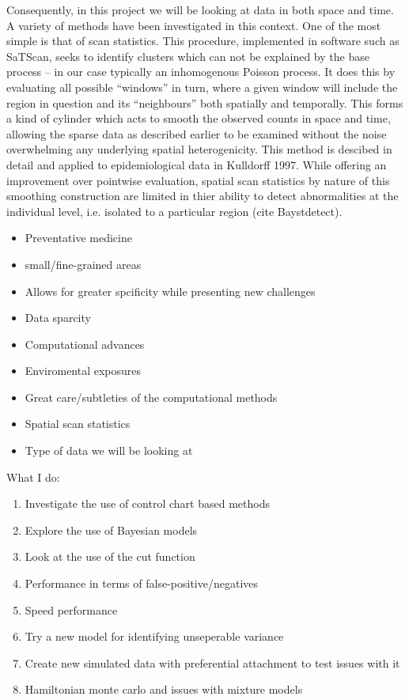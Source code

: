 \documentclass{article}
\begin{document}
Consequently, in this project we will be looking at data in both space and time. A variety of methods have been investigated in this context. One of the most simple is that of scan statistics. This procedure, implemented in software such as SaTScan, seeks to identify clusters which can not be explained by the base process -- in our case typically an inhomogenous Poisson process. It does this by evaluating all possible ``windows'' in turn, where a given window will include the region in question and its ``neighbours'' both spatially and temporally. This forms a kind of cylinder which acts to smooth the observed counts in space and time, allowing the sparse data as described earlier to be examined without the noise overwhelming any underlying spatial heterogenicity. This method is descibed in detail and applied to epidemiological data in Kulldorff 1997. While offering an improvement over pointwise evaluation, spatial scan statistics by nature of this smoothing construction are limited in thier ability to detect abnormalities at the individual level, i.e. isolated to a particular region (cite Baystdetect).      

\begin{itemize}
\item Preventative medicine
\item small/fine-grained areas
\item Allows for greater spcificity while presenting new challenges
\item Data sparcity
\item Computational advances
\item Enviromental exposures
\item Great care/subtleties of the computational methods
\item Spatial scan statistics
\item Type of data we will be looking at
\end{itemize}


What I do:
\begin{enumerate}
\item Investigate the use of control chart based methods
\item Explore the use of Bayesian models
\item Look at the use of the cut function
\item Performance in terms of false-positive/negatives
\item Speed performance
\item Try a new model for identifying unseperable variance
\item Create new simulated data with preferential attachment to test issues with it
\item Hamiltonian monte carlo and issues with mixture models
\end{enumerate}
\end{document}
